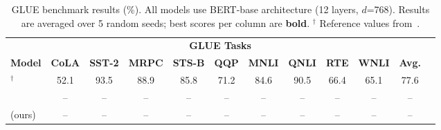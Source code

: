 
\begin{table}[t]
\centering
\small
\caption{
  GLUE benchmark results (\%).
  All models use BERT-base architecture (12 layers, $d$=768).
  Results are averaged over 5 random seeds; best scores per column are \textbf{bold}.
  $^\dagger$ Reference values from~\citet{devlin2019bert}.
}
\label{tab:glue_main}
\begin{tabular}{lccccccccccc}
\toprule
 & \multicolumn{9}{c}{\textbf{GLUE Tasks}} & \\
\cmidrule(lr){2-10}
\textbf{Model}
  & \textbf{CoLA} & \textbf{SST-2} & \textbf{MRPC}  & \textbf{STS-B}
  & \textbf{QQP}  & \textbf{MNLI}  & \textbf{QNLI}  & \textbf{RTE}
  & \textbf{WNLI} & \textbf{Avg.} \\
\midrule
\bertbase{}$^\dagger$
  & 52.1 & 93.5 & 88.9 & 85.8
  & 71.2 & 84.6 & 90.5 & 66.4
  & 65.1 & 77.6 \\
\baseline{}~\citep{hou2022tokendrop}
  & -- & -- & -- & --
  & -- & -- & -- & --
  & -- & -- \\
\midrule
\model{} (ours)
  & -- & -- & -- & --
  & -- & -- & -- & --
  & -- & -- \\
\bottomrule
\end{tabular}
\end{table}
